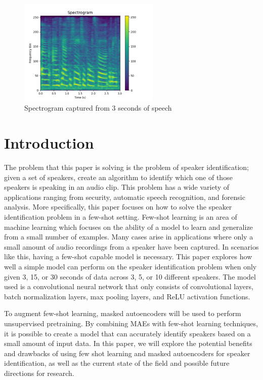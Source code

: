 \documentclass{article}
\begin{document}
\begin{figure}
  \centering
  \includegraphics[width=0.6\textwidth]{Images/spectrogram_example.png}
  \caption{Spectrogram captured from 3 seconds of speech}
  \label{fig:SpectrogramExample}
\end{figure}

\section{Introduction}
The problem that this paper is solving is the problem of speaker identification; given a set of speakers, create an
algorithm to identify which one of those speakers is speaking in an audio clip. This problem has a wide variety of 
applications ranging from security, automatic speech recognition, and forensic analysis. More specifically, this paper focuses
on how to solve the speaker identification problem in a few-shot setting. Few-shot learning is an area of machine learning
which focuses on the ability of a model to learn and generalize from a small number of examples. Many cases arise in applications
where only a small amount of audio recordings from a speaker have been captured. In scenarios like this, having a few-shot
capable model is necessary. This paper explores how well a simple model can perform on the speaker identification problem when only given 3, 15, or
30 seconds of data across 3, 5, or 10 different speakers. The model used is a convolutional neural network that only
consists of convolutional layers, batch normalization layers, max pooling layers, and ReLU activation functions.

To augment few-shot learning, masked autoencoders will be used to perform unsupervised pretraining. By combining MAEs with
few-shot learning techniques, it is possible to create a model that can accurately identify speakers based on a small 
amount of input data. In this paper, we will explore the potential benefits and drawbacks of using few shot learning and
masked autoencoders for speaker identification, as well as the current state of the field and possible future directions
for research.
\end{document}

